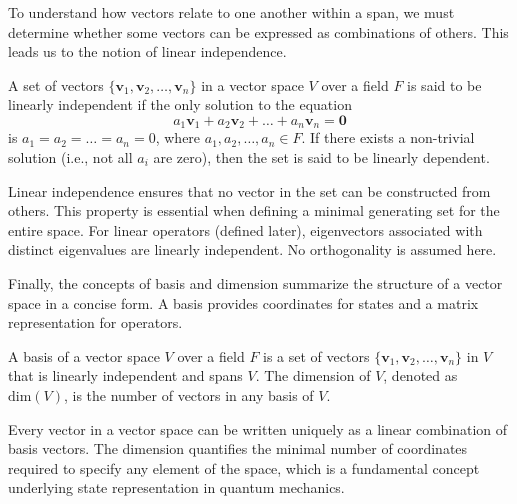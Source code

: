 To understand how vectors relate to one another within a span, we must determine whether some vectors can be expressed as combinations of others. This leads us to the notion of linear independence.
\begin{definition}
A set of vectors $\lbrace\symbf{v}_1,\symbf{v}_2,\ldots,\symbf{v}_n\rbrace$ in a vector space $V$ over a field $F$ is said to be linearly independent if the only solution to the equation
\begin{equation}
a_1\symbf{v}_1+a_2\symbf{v}_2+\ldots+a_n\symbf{v}_n=\symbf{0}
\end{equation}
is $a_1=a_2=\ldots=a_n=0$, where $a_1,a_2,\ldots,a_n\in F$. If there exists a non-trivial solution (i.e., not all $a_i$ are zero), then the set is said to be linearly dependent.
\end{definition}
Linear independence ensures that no vector in the set can be constructed from others. This property is essential when defining a minimal generating set for the entire space. For linear operators (defined later), eigenvectors associated with distinct eigenvalues are linearly independent. No orthogonality is assumed here.

Finally, the concepts of basis and dimension summarize the structure of a vector space in a concise form. A basis provides coordinates for states and a matrix representation for operators.
\begin{definition}[Basis]
A basis of a vector space $V$ over a field $F$ is a set of vectors $\lbrace\symbf{v}_1,\symbf{v}_2,\ldots,\symbf{v}_n\rbrace$ in $V$ that is linearly independent and spans $V$. The dimension of $V$, denoted as $\text{dim}(V)$, is the number of vectors in any basis of $V$.
\end{definition}
Every vector in a vector space can be written uniquely as a linear combination of basis vectors. The dimension quantifies the minimal number of coordinates required to specify any element of the space, which is a fundamental concept underlying state representation in quantum mechanics.
